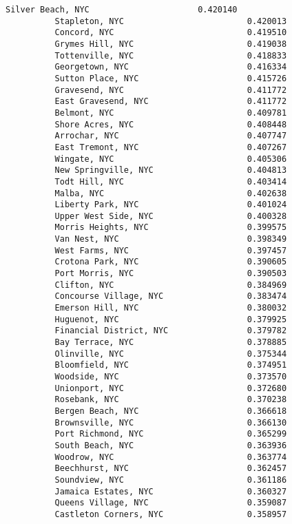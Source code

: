 \documentclass[11pt]{article}
\begin{document}
\begin{Verbatim}[commandchars=\\\{\}]
          Silver Beach, NYC                      0.420140
          Stapleton, NYC                         0.420013
          Concord, NYC                           0.419510
          Grymes Hill, NYC                       0.419038
          Tottenville, NYC                       0.418833
          Georgetown, NYC                        0.416334
          Sutton Place, NYC                      0.415726
          Gravesend, NYC                         0.411772
          East Gravesend, NYC                    0.411772
          Belmont, NYC                           0.409781
          Shore Acres, NYC                       0.408448
          Arrochar, NYC                          0.407747
          East Tremont, NYC                      0.407267
          Wingate, NYC                           0.405306
          New Springville, NYC                   0.404813
          Todt Hill, NYC                         0.403414
          Malba, NYC                             0.402638
          Liberty Park, NYC                      0.401024
          Upper West Side, NYC                   0.400328
          Morris Heights, NYC                    0.399575
          Van Nest, NYC                          0.398349
          West Farms, NYC                        0.397457
          Crotona Park, NYC                      0.390605
          Port Morris, NYC                       0.390503
          Clifton, NYC                           0.384969
          Concourse Village, NYC                 0.383474
          Emerson Hill, NYC                      0.380032
          Huguenot, NYC                          0.379925
          Financial District, NYC                0.379782
          Bay Terrace, NYC                       0.378885
          Olinville, NYC                         0.375344
          Bloomfield, NYC                        0.374951
          Woodside, NYC                          0.373570
          Unionport, NYC                         0.372680
          Rosebank, NYC                          0.370238
          Bergen Beach, NYC                      0.366618
          Brownsville, NYC                       0.366130
          Port Richmond, NYC                     0.365299
          South Beach, NYC                       0.363936
          Woodrow, NYC                           0.363774
          Beechhurst, NYC                        0.362457
          Soundview, NYC                         0.361186
          Jamaica Estates, NYC                   0.360327
          Queens Village, NYC                    0.359087
          Castleton Corners, NYC                 0.358957

\end{Verbatim}
\end{document}
